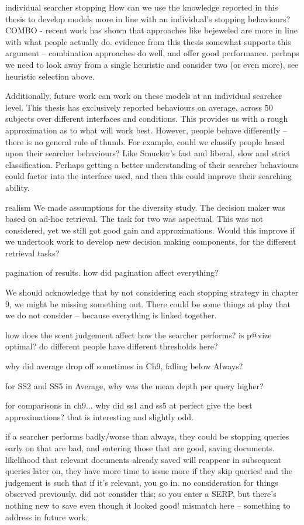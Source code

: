 individual searcher stopping
How can we use the knowledge reported in this thesis to develop models more in line with an individual's stopping behaviours?
COMBO - recent work has shown that approaches like bejeweled are more in line with what people actually do. evidence from this thesis somewhat supports this argument -- combination approaches do well, and offer good performance. perhaps we need to look away from a single heuristic and consider two (or even more), see heuristic selection above.

Additionally, future work can work on these models at an individual searcher level. This thesis has exclusively reported behaviours on average, across \~ 50 subjects over different interfaces and conditions. This provides us with a rough approximation as to what will work best. However, people behave differently -- there is no general rule of thumb. For example, could we classify people based upon their searcher behaviours? Like Smucker's fast and liberal, slow and strict classification. Perhaps getting a better understanding of their searcher behaviours could factor into the interface used, and then this could improve their searching ability.

realism
We made assumptions for the diversity study. The decision maker was based on ad-hoc retrieval.
The task for two was aspectual. This was not considered, yet we still got good gain and approximations. Would this improve if we undertook work to develop new decision making components, for the different retrieval tasks?

pagination of results. how did pagination affect everything?

We should acknowledge that by not considering each stopping strategy in chapter 9, we might be missing something out. There could be some things at play that we do not consider -- because everything is linked together. 

how does the scent judgement affect how the searcher performs? is p@vize optimal? do different people have different thresholds here?

why did average drop off sometimes in Ch9, falling below Always?

for SS2 and SS5 in Average, why was the mean depth per query higher?

for comparisons in ch9... why did ss1 and ss5 at perfect give the best approximations? that is interesting and slightly odd.

if a searcher performs badly/worse than always, they could be stopping queries early on that are bad, and entering those that are good, saving documents. likelihood that relevant documents already saved will reappear in subsequent queries later on, they have more time to issue more if they skip queries! and the judgement is such that if it's relevant, you go in. no consideration for things observed previously. did not consider this; so you enter a SERP, but there's nothing new to save even though it looked good! mismatch here -- something to address in future work.

